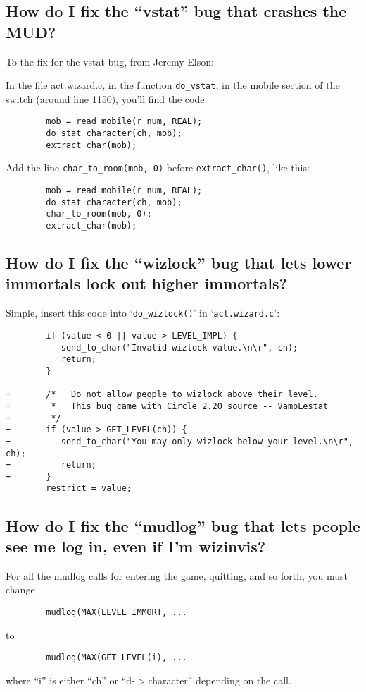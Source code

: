 \documentclass[11pt]{article}
\begin{document}
\subsection{How do I fix the ``vstat'' bug that crashes the MUD?}
To the fix for the vstat bug, from Jeremy Elson:
\par
In the file act.wizard.c, in the function \texttt{do\_vstat}, in the mobile section of the switch (around line 1150), you'll find the code: 
\begin{verbatim}
        mob = read_mobile(r_num, REAL);
        do_stat_character(ch, mob);
        extract_char(mob);
\end{verbatim}
Add the line \texttt{char\_to\_room(mob, 0)} before \texttt{extract\_char()}, like this:
\begin{verbatim}
        mob = read_mobile(r_num, REAL);
        do_stat_character(ch, mob);
        char_to_room(mob, 0);
        extract_char(mob);
\end{verbatim}

\subsection{ How do I fix the ``wizlock'' bug that lets lower immortals lock out higher immortals?}
Simple, insert this code into `\texttt{do\_wizlock()}' in `\texttt{act.wizard.c}':
\begin{verbatim}
        if (value < 0 || value > LEVEL_IMPL) {
           send_to_char("Invalid wizlock value.\n\r", ch);
           return;
        }

+       /*   Do not allow people to wizlock above their level.
+        *   This bug came with Circle 2.20 source -- VampLestat
+        */
+       if (value > GET_LEVEL(ch)) {
+          send_to_char("You may only wizlock below your level.\n\r", ch);
+          return;
+       }
        restrict = value;
\end{verbatim}

\subsection{ How do I fix the ``mudlog'' bug that lets people see me log in, even if I'm wizinvis?}
For all the mudlog calls for entering the game, quitting, and so forth, you must change
\begin{verbatim}
        mudlog(MAX(LEVEL_IMMORT, ...
\end{verbatim}
to
\begin{verbatim}
        mudlog(MAX(GET_LEVEL(i), ...
\end{verbatim}
where ``i'' is either ``ch'' or ``d-$>$character'' depending on the call.
\end{document}
